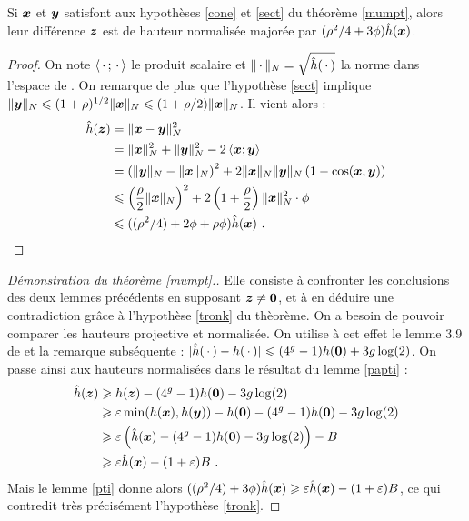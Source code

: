 \documentclass{mpg-preth}
\begin{document}
\begin{lem} \label{pti}
  Si $\p{x}$ et $\p{y}$ satisfont aux hypothèses \ref{cone} et \ref{sect} du
  théorème \ref{mumpt}, alors leur différence $\p{z}$ est de hauteur
  normalisée majorée par $(\rho^2/4 + 3\phi) \hn(\p{x})$.
\end{lem}

\begin{proof}
  On note $\left<\truc ; \truc \right>$ le produit scalaire et $\nv[N]{\truc} =
  \sqrt{\hn(\truc)}$ la norme dans l'espace de . On remarque
  de plus que l'hypothèse \ref{sect} implique $\nv[N]{\p{y}} \le
  (1+\rho)^{1/2}\nv[N]{\p{x}} \le (1+\rho/2) \nv[N]{\p{x}}$. Il vient alors :
  \begin{align*}
  \hn(\p{z}) & = \nv[N]{\p{x}-\p{y}}^2 \\ & = \nv[N]{\p{x}}^2 +
  \nv[N]{\p{y}}^2 - 2\left< \p{x} ; \p{y} \right> \\
  & = \left(\nv[N]{\p{y}} - \nv[N]{\p{x}}\right)^2 +
  2\nv[N]{\p{x}}\nv[N]{\p{y}}\left( 1- \cos(\p{x}, \p{y}) \right) \\
  & \le \left( \frac{\rho}{2}\nv[N]{\p{x}} \right)^2 + 2\left(
  1+\frac{\rho}{2} \right) \nv[N]{\p{x}}^2 \cdot \phi \\
  & \le ((\rho^2/4) + 2\phi + \rho\phi) \hn(\p{x})\pmm{.}\qedhere
  \end{align*}
\end{proof}

\begin{proof}[Démonstration du théorème \ref{mumpt}.]
  Elle consiste à confronter les conclusions des deux lemmes précédents en
  supposant $\p{z} \neq \OA$, et à en déduire une contradiction grâce à
  l'hypothèse \ref{tronk} du thèorème. On a besoin de pouvoir comparer les
  hauteurs projective et normalisée. On utilise à cet effet le lemme 3.9 de
  \cite{daphimhva2} et la remarque subséquente : $\av[]{\hn(\truc) -
    h(\truc)} \le (4^g-1)h(\OA) + 3g\log(2)$. On passe ainsi aux hauteurs
  normalisées dans le résultat du lemme \ref{papti} :
  \begin{align*}
  \hn(\p{z}) & \ge h(\p{z}) - (4^g-1)h(\OA) - 3g\log(2)\\
  & \ge \eps \min(h(\p{x}), h(\p{y})) - h(\OA) - (4^g-1)h(\OA) - 3g\log(2)
  \\
  & \ge \eps \left(\hn(\p{x}) - (4^g-1)h(\OA) - 3g\log(2)\right) - B \\
  & \ge \eps \hn(\p{x}) - (1+\eps)B \pmm{.}
  \end{align*}
  Mais le lemme \ref{pti} donne alors $((\rho^2/4) + 3\phi) \hn(\p{x}) \ge
  \eps \hn(\p{x}) - (1+\eps)B$, ce qui contredit très précisément l'hypothèse
  \ref{tronk}.
\end{proof}

\printbibliography
\end{document}
